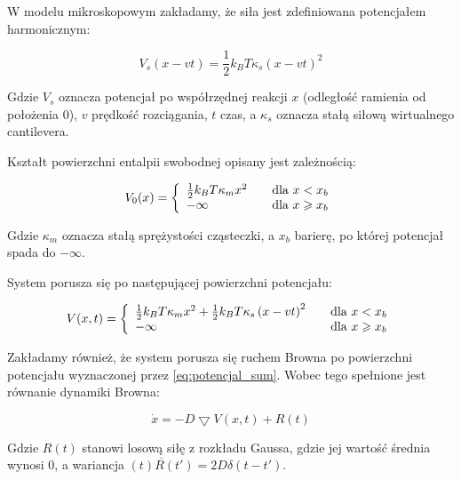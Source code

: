 W modelu mikroskopowym zakładamy, że siła jest zdefiniowana potencjałem harmonicznym:

\begin{equation} V_{s}(x-vt)=\frac{1}{2} k_{B} T \kappa_{s}\left(x-vt\right)^2 \label{eq:harm}\end{equation}

Gdzie $V_{s}$ oznacza potencjał po współrzędnej reakcji $x$ (odległość ramienia od położenia 0), $v$ prędkość rozciągania, $t$ czas, a $\kappa_{s}$ oznacza stałą siłową wirtualnego cantilevera.

Kształt powierzchni entalpii swobodnej opisany jest zależnością:


\begin{equation} V_{0}(x)=\left\{
\begin{array}{l l} 
\frac{1}{2} k_{B} T \kappa_{m}x^2 & \quad \text{dla } x <  x_{b}\\
- \infty & \quad  \text{dla } x \geqslant x_{b}\\
\end{array} \right.
\label{eq:ent}\end{equation}

Gdzie $\kappa_{m}$ oznacza stałą sprężystości cząsteczki, a $x_{b}$ barierę, po której potencjał spada do $-\infty$.

System porusza się po następującej powierzchni potencjału: 

\begin{equation} V(x,t)=\left\{
\begin{array}{l l} 
\frac{1}{2} k_{B} T \kappa_{m}x^2 +\frac{1}{2} k_{B} T \kappa_{s}\left(x-vt\right)^2& \quad \text{dla } x <  x_{b}\\
- \infty & \quad  \text{dla } x \geqslant x_{b}\\
\end{array} \right.
\label{eq:potencjal_sum}\end{equation}

Zakładamy również, że system porusza się ruchem Browna po powierzchni potencjału wyznaczonej przez \ref{eq:potencjal_sum}. Wobec tego spełnione jest równanie dynamiki Browna:

\begin{equation} \dot{x}=-D \bigtriangledown V (x,t) +R(t)\label{eq:brown}\end{equation}

Gdzie $R(t)$ stanowi losową siłę z rozkładu Gaussa, gdzie jej wartość średnia wynosi 0, a wariancja $\overline{(t)R(t')}=2D\delta(t-t')$.

